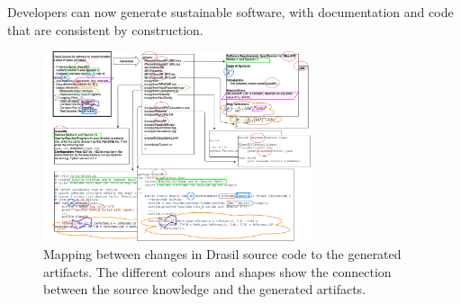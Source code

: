 \documentclass[onecolumn]{IEEEtran}
\begin{document}
\begin{multicols}{2}
Developers can now generate sustainable software, with documentation and code
that are consistent by construction.


  
\end{multicols}

\begin{figure}[h!]
\centering
\includegraphics[width=0.7\textwidth]{./figures/DrasilSupportsChange.png}
\caption{Mapping between changes in Drasil source code to the generated
  artifacts.  The different colours and shapes show the connection between the
  source knowledge and the generated artifacts.}
\label{Fig_DrasilAndChange}
\end{figure}
\end{document}
